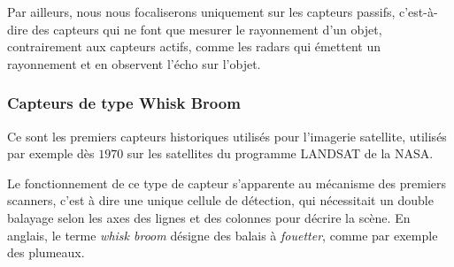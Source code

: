 \documentclass[a4paper, 11pt]{report}
\begin{document}
Par ailleurs, nous nous focaliserons uniquement sur les capteurs passifs, c'est-à-dire des capteurs qui ne font que mesurer le rayonnement d'un objet, contrairement aux capteurs actifs, comme les radars qui émettent un rayonnement et en observent l'écho sur l'objet.
\subsubsection{Capteurs de type Whisk Broom}
Ce sont les premiers capteurs historiques utilisés pour l'imagerie satellite, utilisés par exemple dès $1970$ sur les satellites du programme LANDSAT de la NASA.

Le fonctionnement de ce type de capteur s'apparente au mécanisme des premiers scanners, c'est à dire une unique cellule de détection, qui nécessitait un double balayage selon les axes des lignes et des colonnes pour décrire la scène.
En anglais, le terme \emph{whisk broom} désigne des balais à \emph{fouetter}, comme par exemple des plumeaux.
\end{document}
